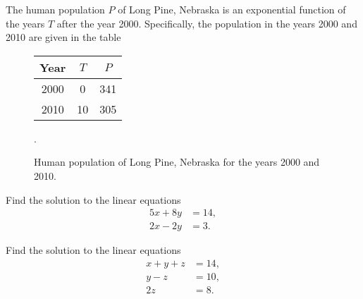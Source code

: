 \documentclass[12pt,fleqn]{exam}
\begin{document}
\begin{questions} 

\question The human population $P$ of Long Pine, Nebraska is an exponential function of the years $T$ after the year 2000.  Specifically,
the population in the years 2000 and 2010 are given in the table

\begin{figure*}[h]
\begin{center}
\begin{tabular}{|c|c|c|} \hline
  Year & $T$  & $P$ \\ \hline
  2000 & 0    & 341  \\
  2010 & 10   & 305  \\ \hline
  \end{tabular}.
  \caption{Human population of Long Pine, Nebraska for the years 2000 and 2010.}
  \end{center}
\end{figure*}

\hfill
\newpage


\question [2]  Find the solution to the linear equations
\begin{align*}
   5 x + 8 y &= 14, \\
   2 x - 2 y &= 3.
\end{align*}

\begin{solution}[3.0in]

\end{solution}

\question [2] Find the solution to the linear equations
\begin{align*}
   x + y + z &= 14, \\
   y - z &= 10,\\
   2 z &= 8.
\end{align*}

\end{questions}
\end{document}
